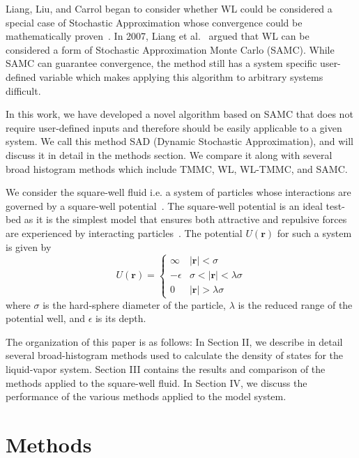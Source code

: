 \documentclass[letterpaper,twocolumn,amsmath,amssymb,pre,aps,10pt]{revtex4-1}
\begin{document}
Liang, Liu, and Carrol began to consider whether WL could be considered
a special case of Stochastic Approximation whose convergence could be
mathematically proven~\cite{liang2006theory, liang2007stochastic}. In
2007, Liang et al.~\cite{liang2007stochastic} argued that WL can be
considered a form of Stochastic Approximation Monte Carlo (SAMC). While
SAMC can guarantee convergence, the method still has a system specific
user-defined variable which makes applying this algorithm to arbitrary
systems difficult.

In this work, we have developed a novel algorithm based on SAMC that
does not require user-defined inputs and therefore should be easily
applicable to a given system.  We call this method SAD (Dynamic
Stochastic Approximation), and will discuss it in detail in the methods
section. We compare it along with several broad histogram methods
which include TMMC, WL, WL-TMMC, and SAMC.

We consider the square-well fluid i.e. a system of particles whose
interactions are governed by a square-well
potential~\cite{singh2003surface, barker2004perturbationSW}.  The
square-well potential is an ideal test-bed as it is the simplest model
that ensures both attractive and repulsive forces are experienced by
interacting particles~\cite{barker1967-SW-perturbation, vega1992phase}.
The potential $U(\textbf{r})$ for such a system is given by
\begin{equation}
 U(\textbf{r})=\begin{cases} \infty &
 \lvert\textbf{r}\rvert< \sigma\\-\epsilon &
 \sigma<\lvert\textbf{r}\rvert<\lambda\sigma\\0 &
 \lvert\textbf{r}\rvert > \lambda\sigma\end{cases}
\end{equation}
where $\sigma$ is the hard-sphere diameter of the particle, $\lambda$ is the
reduced range of the potential well, and $\epsilon$ is its depth.

The organization of this paper is as follows: In Section II, we
describe in detail several broad-histogram methods used to calculate
the density of states for the liquid-vapor system.  Section III
contains the results and comparison of the methods applied to the
square-well fluid.  In Section IV, we discuss the performance of the
various methods applied to the model system.

\section{Methods}
\end{document}
